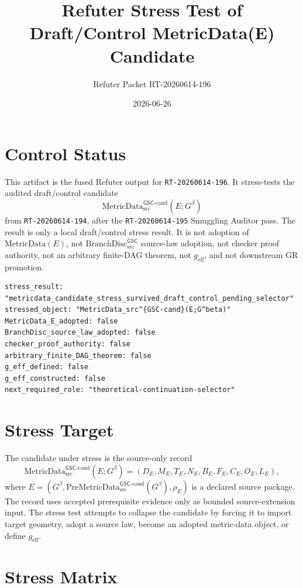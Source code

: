 \documentclass[11pt]{article}
\title{Refuter Stress Test of Draft/Control MetricData(E) Candidate}
\author{Refuter Packet RT-20260614-196}
\date{2026-06-26}
\newcommand{\MetricData}{\mathrm{MetricData}_{\mathrm{src}}^{\mathsf{GSC}\mbox{-}\mathrm{cand}}}
\newcommand{\PreMetricData}{\mathrm{PreMetricData}_{\mathrm{src}}^{\mathsf{GSC}\mbox{-}\mathrm{cand}}}
\newcommand{\BranchDisc}{\mathrm{BranchDisc}_{\mathrm{src}}^{\mathsf{GSC}}}
\newcommand{\Gbeta}{G^\beta}
\newcommand{\geff}{g_{\mathrm{eff}}}
\begin{document}
\maketitle

\section{Control Status}

This artifact is the fused Refuter output for \texttt{RT-20260614-196}. It
stress-tests the audited draft/control candidate
\[
  \MetricData(E;\Gbeta)
\]
from \texttt{RT-20260614-194}, after the \texttt{RT-20260614-195} Smuggling
Auditor pass. The result is only a local draft/control stress result. It is
not adoption of \(\mathrm{MetricData}(E)\), not \(\BranchDisc\) source-law
adoption, not checker proof authority, not an arbitrary finite-DAG theorem,
not \(\geff\), and not downstream GR promotion.

\begin{verbatim}
stress_result: "metricdata_candidate_stress_survived_draft_control_pending_selector"
stressed_object: "MetricData_src^{GSC-cand}(E;G^beta)"
MetricData_E_adopted: false
BranchDisc_source_law_adopted: false
checker_proof_authority: false
arbitrary_finite_DAG_theorem: false
g_eff_defined: false
g_eff_constructed: false
next_required_role: "theoretical-continuation-selector"
\end{verbatim}

\section{Stress Target}

The candidate under stress is the source-only record
\[
  \MetricData(E;\Gbeta)=
  (D_E,M_E,T_E,N_E,B_E,F_E,C_E,O_E,L_E),
\]
where \(E=(\Gbeta,\PreMetricData(\Gbeta),\rho_E)\) is a declared source
package. The record uses accepted prerequisite evidence only as bounded
source-extension input. The stress test attempts to collapse the candidate by
forcing it to import target geometry, adopt a source law, become an adopted
metric-data object, or define \(\geff\).

\section{Stress Matrix}
\end{document}

